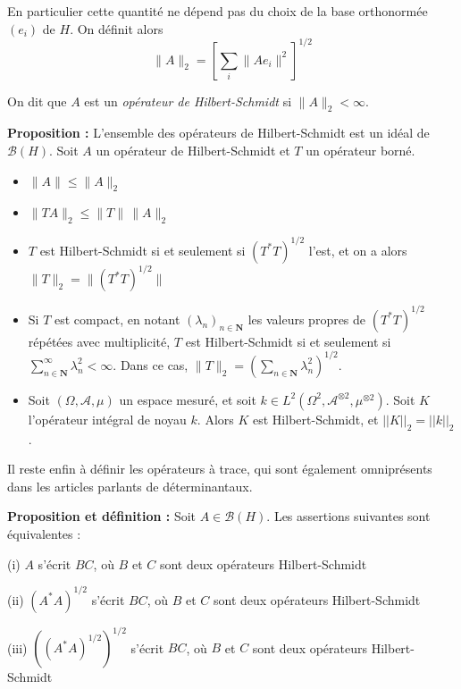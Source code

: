 \documentclass[12pt]{article}
\let\oldsum\sum
\renewcommand{\sum}{\oldsum\limits}
\begin{document}
En particulier cette quantité ne dépend pas du choix de la base orthonormée $ (e_i) $ de $H$. On définit alors $$ \|A\|_2 = \left[ \sum_i \|A e_i\|^2 \right]^{1/2}$$ 

On dit que $A$ est un \textit{opérateur de Hilbert-Schmidt} si $ \|A\|_2 < \infty $. 

\textbf{Proposition :} L'ensemble des opérateurs de Hilbert-Schmidt est un idéal de $\mathcal B(H)$. Soit $A$ un opérateur de Hilbert-Schmidt et $T$ un opérateur borné.

\begin{itemize} 

    \item $\| A\| \leqslant \|A\|_2 $

    \item $ \|TA\|_2 \leqslant \|T \| \, \|A\|_2 $

    \item $T$ est Hilbert-Schmidt si et seulement si $(T^* T)^{1/2} $ l'est, et on a alors $ \| T\|_2 = \| (T^* T)^{1/2}\| $ 

    \item Si $T$ est compact, en notant $(\lambda_n)_{n\in \mathbf N} $ les valeurs propres de $ (T^* T)^{1/2} $ répétées avec multiplicité, $T$ est Hilbert-Schmidt si et seulement si $ \displaystyle \sum_{n \in \mathbf N}^\infty \lambda_n^2 < \infty $. Dans ce cas, $ \displaystyle \|T \|_2 = \left( \sum_{n \in \mathbf N} \lambda^2_n \right)^{1/2}  $.

    \item Soit $(\Omega, \mathcal A, \mu)$ un espace mesuré, et soit $ k \in L^2(\Omega^2, \mathcal A^{\otimes 2}, \mu^{\otimes 2 })$. Soit $K$ l'opérateur intégral de noyau $k$. Alors $K$ est Hilbert-Schmidt, et $ ||K||_2 = ||k||_2 $.

\end{itemize}

Il reste enfin à définir les opérateurs à trace, qui sont également omniprésents dans les articles parlants de déterminantaux.

\textbf{Proposition et définition :} Soit $A \in \mathcal B(H)$. Les assertions suivantes sont équivalentes :

(i) $A$ s'écrit $BC$, où $B$ et $C$ sont deux opérateurs Hilbert-Schmidt 

(ii) $(A^*A)^{1/2}$ s'écrit $BC$, où $B$ et $C$ sont deux opérateurs Hilbert-Schmidt 

(iii) $((A^*A)^{1/2})^{1/2}$ s'écrit $BC$, où $B$ et $C$ sont deux opérateurs Hilbert-Schmidt 
\end{document}
